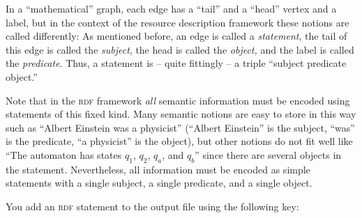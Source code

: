 In a ``mathematical'' graph, each edge has a ``tail'' and a
``head'' vertex and a label, but in the context of the resource
description framework these notions are called differently: As
mentioned before, an edge is called a \emph{statement}, the tail of
this edge is called the \emph{subject}, the head is called the
\emph{object,} and the label is called the \emph{predicate}. Thus, a
statement is -- quite fittingly -- a triple ``subject predicate
object.''

Note that in the \textsc{rdf} framework \emph{all} semantic
information must be encoded using statements of this fixed kind. Many
semantic notions are easy to store in this way such as ``Albert
Einstein was a physicist'' (``Albert Einstein'' is the subject,
``was'' is the predicate, ``a physicist'' is the object), but other
notions do not fit well like ``The automaton has states $q_1$, $q_2$,
$q_a$, and $q_b$'' since there are several objects in the
statement. Nevertheless, all information must be encoded as simple
statements with a single subject, a single predicate, and a single
object.

You add an \textsc{rdf} statement to the output file using the
following key:

